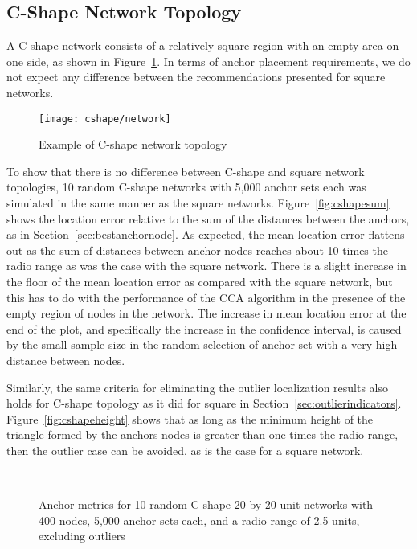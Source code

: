 \subsection{C-Shape Network Topology}

A C-shape network consists of a relatively square region with an empty area on one side, as shown in Figure~\ref{fig:cnetwork}.  In terms of anchor placement requirements, we do not expect any difference between the recommendations presented for square networks.

\begin{figure}
  \centering
	\texttt{[image: cshape/network]}
	\caption{Example of C-shape network topology}
	\label{fig:cnetwork}
\end{figure}

To show that there is no difference between C-shape and square network topologies, 10 random C-shape networks with 5,000 anchor sets each was simulated in the same manner as the square networks.  Figure~\ref{fig:cshapesum} shows the location error relative to the sum of the distances between the anchors, as in Section~\ref{sec:bestanchornode}.  As expected, the mean location error flattens out as the sum of distances between anchor nodes reaches about 10 times the radio range as was the case with the square network.  There is a slight increase in the floor of the mean location error as compared with the square network, but this has to do with the performance of the CCA algorithm in the presence of the empty region of nodes in the network.  The increase in mean location error at the end of the plot, and specifically the increase in the confidence interval, is caused by the small sample size in the random selection of anchor set with a very high distance between nodes.
 
Similarly, the same criteria for eliminating the outlier localization results also holds for C-shape topology as it did for square in Section~\ref{sec:outlierindicators}.  Figure~\ref{fig:cshapeheight} shows that as long as the minimum height of the triangle formed by the anchors nodes is greater than one times the radio range, then the outlier case can be avoided, as is the case for a square network.

\begin{figure}
  \centering
	\\
	\caption[Anchor metrics for a C-Shape topology]{Anchor metrics for 10 random C-shape 20-by-20 unit networks with 400 nodes, 5,000 anchor sets each, and a radio range of 2.5 units, excluding outliers}
	\label{fig:cindicator}
\end{figure}

